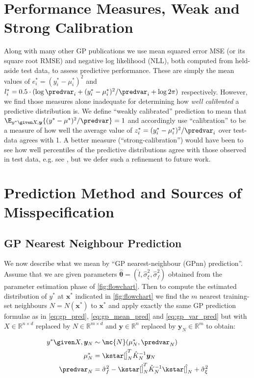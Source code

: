 \section{Performance Measures, Weak and Strong Calibration}
\label{predictive_measures}
Along with many other GP publications we use mean squared error MSE (or its square root RMSE) and negative log likelihood (NLL), both computed from held-aside test data, to assess predictive performance. These are simply the mean values of $e^*_i=(y^*_i - {\mu_i^*})^2$ and $l^*_i= 0.5 \cdot (\log \predvar_i + (y_i^*-\mu_i^*)^2/\predvar_i + \log2\pi)$ respectively. However, we find those measures alone inadequate for determining how {\it well calibrated} a predictive distribution is. We define ``weakly calibrated'' prediction to mean that $\E_{y^* \given X,\bm{y} } \{(y^*-\mu^*)^2/\predvar \} = 1$ and accordingly use ``calibration'' to be a measure of how well the average value of $z^*_i= (y_i^*-\mu_i^*)^2 / \predvar_{i}$ over test-data agrees with 1. A better measure (``strong-calibration'') would have been to see how well percentiles of the predictive distributions agree with those observed in test data, e.g. see \cite{Song2019}, but we defer such a refinement to future work.


\section{Prediction Method and Sources of Misspecification}



\subsection{GP Nearest Neighbour Prediction}
\label{exact_NN_prediction}
We now describe what we mean by ``GP nearest-neighbour (GPnn) prediction''. Assume that we are given parameters $\hat{\bm{\theta}} = (\hat{l},\hat{\sigma}_\xi^2,\hat{\sigma}_f^2)$ obtained from the parameter estimation phase of \autoref{fig:flowchart}. Then to compute the estimated distribution of $y^*$ at $\bm{x}^*$ indicated in \autoref{fig:flowchart} we find the $m$ nearest training-set neighbours $N = N(\bm{x}^*)$ to $\bm{x}^*$ and apply exactly the same GP prediction formulae as in \eqref{eq:gp_pred}, \eqref{eq:gp_mean_pred} and \eqref{eq:gp_var_pred} but with $X \in \mathbb{R}^{n \times d}$ replaced by $N \in \mathbb{R}^{m \times d}$ and $\bm{y} \in \mathbb{R}^n $ replaced by $\bm{y}_N \in \mathbb{R}^m$ to obtain:


\begin{align}
  y^*\given X,\bm{y}_N &\sim \mc{N}(\mu_N^*,\predvar_N)\label{eq:gpnn_pred} \\
  \mu_N^* &= \kstar[\hat]_N^T \hat{K}_N^{-1}\bm{y}_N \label{eq:gpnn_mean_pred}\\
  \predvar_N &= \hat{\sigma}_f^2 - \kstar[\hat]_N^T \hat{K}_N^{-1}\kstar[\hat]_N + \hat{\sigma}_\xi^2 \label{eq:gpnn_var_pred}
\end{align}

